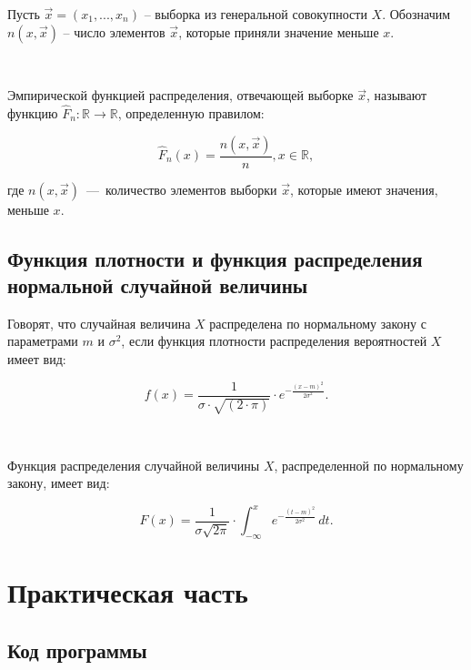 Пусть $\vec x = (x_1, ..., x_n)$ -- выборка из генеральной совокупности $X$. Обозначим $n(x, \vec x)$ -- число элементов $\vec x$, которые приняли значение меньше $x$.

~\

Эмпирической функцией распределения, отвечающей выборке $\vec{x}$, называют функцию $\hat{F}_n: \mathbb{R} \to \mathbb{R}$, определенную правилом: 

\begin{equation*}
 \hat{F}_n(x) = \frac{n(x, \vec x)}{n}, x \in \mathbb{R},
\end{equation*}

\noindent где $n(x, \vec x)$~---~количество элементов выборки $\vec x$, которые имеют значения, меньше $x$.

\section{Функция плотности и функция распределения нормальной случайной величины}

Говорят, что случайная величина $X$ распределена по нормальному закону с параметрами $m$ и $\sigma^2$, если функция плотности распределения вероятностей $X$ имеет вид:

\begin{equation*}
 f(x) = \frac{1}{\sigma \cdot \sqrt{(2 \cdot \pi)}} \cdot e^{-\frac{(x - m)^2}{2\sigma^2}}.
\end{equation*}

~\

Функция распределения случайной величины $X$, распределенной по нормальному закону, имеет вид:

\begin{equation*}
 F(x) = \frac{1}{\sigma \sqrt{2 \pi}} \cdot \int_{-\infty}^{x}e^{-\frac{(t - m)^2}{2\sigma^2}}\, dt.
\end{equation*}

\chapter{Практическая часть}

\section{Код программы}

